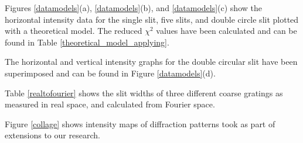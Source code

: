 \documentclass[twocolumn]{revtex4}
\begin{document}
Figures \ref{datamodels}(a), \ref{datamodels}(b), and \ref{datamodels}(c) show the horizontal intensity data for the single slit, five slits, and double circle slit plotted with a theoretical model. The reduced $\chi^2$ values have been calculated and can be found in Table \ref{theoretical_model_applying}.

The horizontal and vertical intensity graphs for the double circular slit have been superimposed and can be found in Figure \ref{datamodels}(d).

Table \ref{realtofourier} shows the slit widths of three different coarse gratings as measured in real space, and calculated from Fourier space.

Figure \ref{collage} shows intensity maps of diffraction patterns took as part of extensions to our research.
\end{document}
